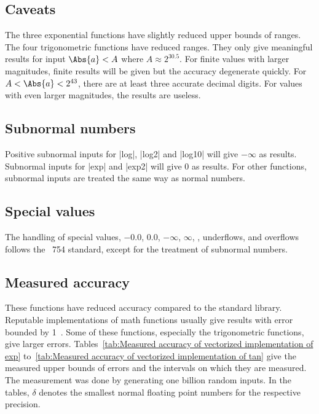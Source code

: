 \subsection{Caveats}
\label{sub:Caveats}

The three exponential functions have slightly reduced upper bounds of ranges.
The four trigonometric functions have reduced ranges. They only give meaningful
results for input $\Abs{a} < A$ where $A \approx 2^{30.5}$. For finite values
with larger magnitudes, finite results will be given but the accuracy
degenerate quickly. For $A < \Abs{a} < 2^{43}$, there are at least three
accurate decimal digits. For values with even larger magnitudes, the results
are useless.

\subsection{Subnormal numbers}
\label{sub:Subnormal numbers}

Positive subnormal inputs for |log|, |log2| and |log10| will give $-\infty$ as
results. Subnormal inputs for |exp| and |exp2| will give $0$ as results. For
other functions, subnormal inputs are treated the same way as normal numbers.

\subsection{Special values}
\label{sub:Special values}

The handling of special values, $-0.0$, $0.0$, $-\infty$, $\infty$, \nan,
underflows, and overflows follows the \ieee~754 standard, except for the
treatment of subnormal numbers.

\subsection{Measured accuracy}
\label{sub:Measured accuracy}

These functions have reduced accuracy compared to the standard library.
Reputable implementations of math functions usually give results with error
bounded by 1~\ulp. Some of these functions, especially the trigonometric
functions, give larger errors. Tables~\ref{tab:Measured accuracy of vectorized
  implementation of exp} to~\ref{tab:Measured accuracy of vectorized
implementation of tan} give the measured upper bounds of errors and the
intervals on which they are measured. The measurement was done by generating
one billion random inputs. In the tables, $\delta$ denotes the smallest normal
floating point numbers for the respective precision.


